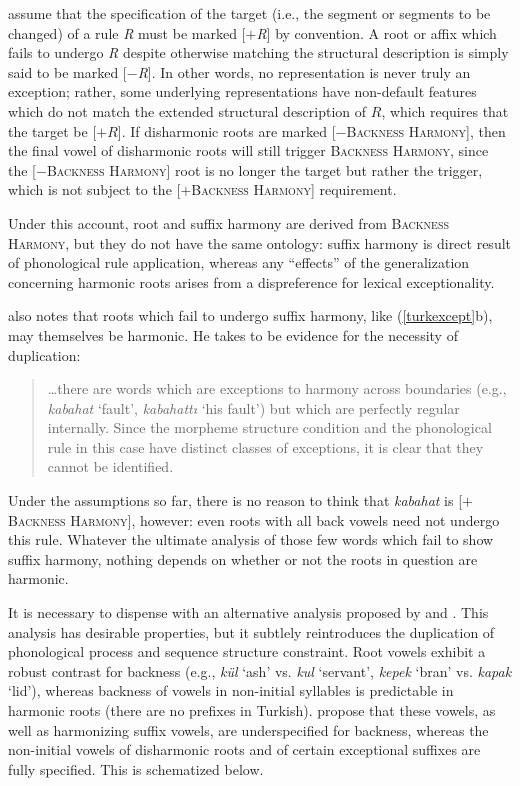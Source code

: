 \citeauthor{SPE} assume that the specification of the target (i.e., the segment or segments to be changed) of a rule \emph{R} must be marked [$+$\emph{R}] by convention. 
A root or affix which fails to undergo \emph{R} despite otherwise matching the structural description is simply said to be marked [$-$\emph{R}]. 
In other words, no representation is never truly an exception; rather, some underlying representations have non-default features which do not match the extended structural description of $R$, which requires that the target be [$+R$]. 
If disharmonic roots are marked [$-$\textsc{Backness Harmony}], then the final vowel of disharmonic roots will still trigger \textsc{Backness Harmony}, since the [$-$\textsc{Backness Harmony}] root is no longer the target but rather the trigger, which is not subject to the [$+$\textsc{Backness Harmony}] requirement.

Under this account, root and suffix harmony are derived from \textsc{Backness Harmony}, but they do not have the same ontology: suffix harmony is direct result of phonological rule application, whereas any ``effects'' of the  generalization concerning harmonic roots arises from a dispreference for lexical exceptionality.

\citeauthor{A74} also notes that roots which fail to undergo suffix harmony, like (\ref{turkexcept}b), may themselves be harmonic. He takes to be evidence for the necessity of duplication:

\begin{quote}
\ldots{}there are words which are exceptions to harmony across boundaries (e.g., \emph{kabahat} `fault', \emph{kabahattı} `his fault') but which are perfectly regular internally. Since the morpheme structure condition and the phonological rule in this case have distinct classes of exceptions, it is clear that they cannot be identified. \citep[289]{A74}
\end{quote}

\noindent
Under the assumptions so far, there is no reason to think that \emph{kabahat} is [$+$\textsc{Backness Harmony}], however: even roots with all back vowels need not undergo this rule. Whatever the ultimate analysis of those few words which fail to show suffix harmony, nothing depends on whether or not the roots in question are harmonic.

It is necessary to dispense with an alternative analysis proposed by \citet{Clements1982} and \citet{Inkelas1997}. 
This analysis has desirable properties, but it subtlely reintroduces the duplication of phonological process and sequence structure constraint. 
Root vowels exhibit a robust contrast for backness (e.g., \emph{kül} `ash' vs. \emph{kul} `servant', \emph{kepek} `bran' vs. \emph{kapak} `lid'), whereas backness of vowels in non-initial syllables is predictable in harmonic roots (there are no prefixes in Turkish).
\citeauthor{Clements1982} propose that these vowels, as well as harmonizing suffix vowels, are underspecified for backness, whereas the non-initial vowels of disharmonic roots and of certain exceptional suffixes are fully specified. 
This is schematized below.


